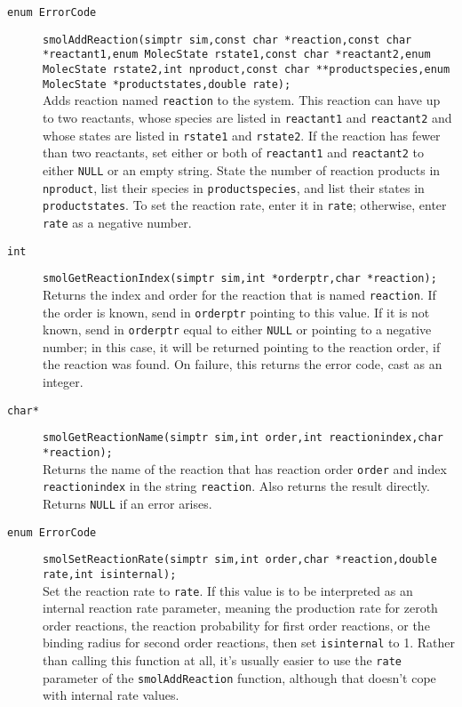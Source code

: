 \documentclass {book}
\begin{document}
\begin{description}

\item[\texttt{enum ErrorCode}]
\texttt{smolAddReaction(simptr sim,const char *reaction,const char *reactant1,enum MolecState rstate1,const char *reactant2,enum MolecState rstate2,int nproduct,const char **productspecies,enum MolecState *productstates,double rate);}
\hfill \\
Adds reaction named \texttt{reaction} to the system.  This reaction can have up to two reactants, whose species are listed in \texttt{reactant1} and \texttt{reactant2} and whose states are listed in \texttt{rstate1} and \texttt{rstate2}.  If the reaction has fewer than two reactants, set either or both of \texttt{reactant1} and \texttt{reactant2} to either \texttt{NULL} or an empty string.  State the number of reaction products in \texttt{nproduct}, list their species in \texttt{productspecies}, and list their states in \texttt{productstates}.  To set the reaction rate, enter it in \texttt{rate}; otherwise, enter \texttt{rate} as a negative number.

\item[\texttt{int}]
\texttt{smolGetReactionIndex(simptr sim,int *orderptr,char *reaction);}
\hfill \\
Returns the index and order for the reaction that is named \texttt{reaction}.  If the order is known, send in \texttt{orderptr} pointing to this value.  If it is not known, send in \texttt{orderptr} equal to either \texttt{NULL} or pointing to a negative number; in this case, it will be returned pointing to the reaction order, if the reaction was found.  On failure, this returns the error code, cast as an integer.

\item[\texttt{char*}]
\texttt{smolGetReactionName(simptr sim,int order,int reactionindex,char *reaction);}
\hfill \\
Returns the name of the reaction that has reaction order \texttt{order} and index \texttt{reactionindex} in the string \texttt{reaction}.  Also returns the result directly.  Returns \texttt{NULL} if an error arises.

\item[\texttt{enum ErrorCode}]
\texttt{smolSetReactionRate(simptr sim,int order,char *reaction,double rate,int isinternal);}
\hfill \\
Set the reaction rate to \texttt{rate}.  If this value is to be interpreted as an internal reaction rate parameter, meaning the production rate for zeroth order reactions, the reaction probability for first order reactions, or the binding radius for second order reactions, then set \texttt{isinternal} to 1.  Rather than calling this function at all, it's usually easier to use the \texttt{rate} parameter of the \texttt{smolAddReaction} function, although that doesn't cope with internal rate values.


\end{description}
\end{document}
